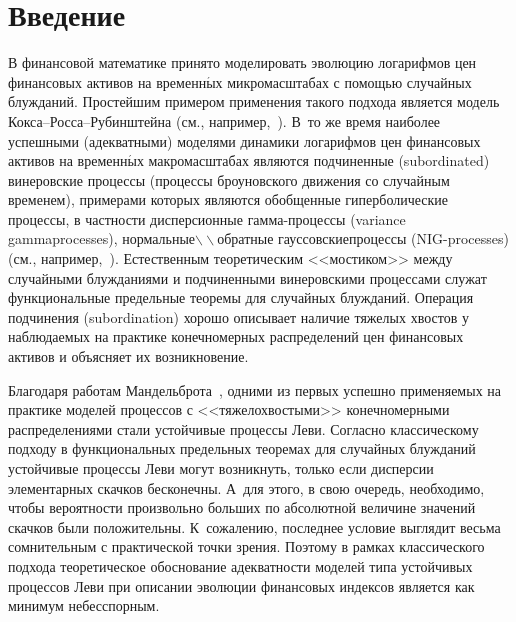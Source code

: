       \begin{multicols}{2}

            \label{st\stat}



\section{Введение}

В финансовой математике принято моделировать эволюцию логарифмов цен
финансовых активов на временн$\acute{\mbox{ы}}$х микромасштабах с помощью
случай\-ных блужданий. Простейшим примером применения такого подхода
является модель Кок\-са--Рос\-са--Ру\-бин\-штей\-на (см., например,~\cite{Shiryaev1998}).
В~то же время наиболее успешными (адекватными)
моделями динамики логарифмов цен финансовых активов на временн$\acute{\mbox{ы}}$х
макромасштабах являются подчиненные (subordinated) винеровские
процессы (процессы броуновского движения со случайным временем),
примерами которых являются обобщенные гиперболические процессы, в
частности дисперсионные гам\-ма-про\-цес\-сы (variance gamma\linebreak processes),
нормальные$\backslash\!\backslash$обратные гауссовские\linebreak процессы
(NIG-processes) (см., например,~\cite{Korolev2011}). Естественным
теоретическим <<мостиком>> между случайными блужданиями и
подчиненными винеровскими процессами служат функциональные
предельные теоремы для случайных блужданий. Операция подчинения
(subordination) хорошо описывает наличие тяжелых хвостов у
наблюдаемых на практике конечномерных распределений цен финансовых
активов и объясняет их возникновение.

Благодаря работам Мандельброта~\cite{Mandelbrot1963}, одними из
первых успешно применяемых на практике моделей процессов с
<<тяжелохвостыми>> конечномерными распределениями стали устойчивые
процессы Леви. Согласно классическому подходу в функциональных
предельных теоремах для случайных блуж\-да\-ний устойчивые процессы Леви
могут возникнуть, только если дисперсии элементарных скачков
бесконечны. А~для этого, в свою очередь, необходимо, чтобы
вероятности произвольно больших по абсолютной величине значений
скачков были положительны. К~сожалению, последнее условие выглядит
весьма сомнительным с практической точки зрения. Поэтому в рамках
классического подхода теоретическое обоснование адекватности моделей
типа устойчивых процессов Леви при описании эволюции финансовых
индексов является как минимум небесспорным.


\end{multicols}
